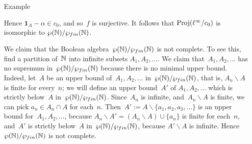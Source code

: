 \documentclass[a]{subfiles}
\begin{document}
\begin{parsec}
\begin{point}{Example}
\begin{point}
Hence $\mathbf{1}_A - \alpha \in c_0$,
and so~$f$ is surjective.
It follows that $\operatorname{Proj}(\ell^\infty/c_0)$
is isomorphic to $\wp(\mathbb{N})/\wp_{fin}(\mathbb{N})$.
\end{point}
\begin{point}%
We claim that the Boolean algebra~$\wp(\mathbb{N})/\wp_{fin}(\mathbb{N})$
is not complete.
To see this,
find a partition of~$\mathbb{N}$ into infinite subsets
$A_1,A_2,\dotsc$.
We claim that~$A_1,A_2,\dotsc$ has no supremum in~$\wp(\mathbb{N})/\wp_{fin}(\mathbb{N})$
because there is no minimal upper bound.
Indeed,
let~$A$ be an upper bound of~$A_1,A_2,\dotsc$ in~$\wp(\mathbb{N})/\wp_{fin}(\mathbb{N})$,
that is, $A_n\backslash A$ is finite for every~$n$;
we will define an upper bound~$A'$ of $A_1,A_2,\dotsc$
which is strictly below~$A$ in~$\wp(\mathbb{N})/\wp_{fin}(\mathbb{N})$.
Since~$A_n$ is infinite,
and~$A_n\backslash A$ is finite,
we can pick $a_n\in A_n\cap A$ for each~$n$.
Then~$A':=A \backslash \{a_1,a_2,a_3,\dotsc\}$
is an upper bound for~$A_1,A_2,\dotsc$,
because $A_n\backslash A' = (A_n\backslash A)\cup\{a_n\}$ is finite
for each~$n$,
and~$A'$ is strictly below~$A$ in~$\wp(\mathbb{N})/\wp_{fin}(\mathbb{N})$,
because $A'\backslash A$ is infinite.
Hence~$\wp(\mathbb{N})/\wp_{fin}(\mathbb{N})$
is not complete.
\end{point}
\begin{point}%
\end{point}
\end{point}
\end{parsec}
\end{document}
